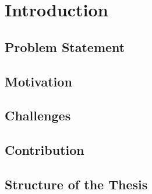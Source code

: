 \chapter{Introduction}

	\section{Problem Statement}
	
	\section{Motivation}
	
	\section{Challenges}
	
	\section{Contribution}
	
	\section{Structure of the Thesis}
